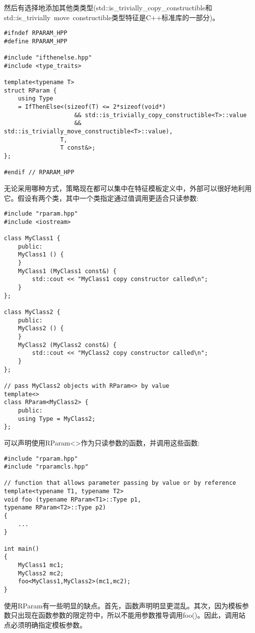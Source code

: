 然后有选择地添加其他类类型(std::is\_trivially\_copy\_constructible和std::is\_trivially\ move\ constructible类型特征是C++标准库的一部分)。

\begin{lstlisting}[style=styleCXX]
#ifndef RPARAM_HPP
#define RPARAM_HPP

#include "ifthenelse.hpp"
#include <type_traits>

template<typename T>
struct RParam {
	using Type
	= IfThenElse<(sizeof(T) <= 2*sizeof(void*)
					&& std::is_trivially_copy_constructible<T>::value
					&& std::is_trivially_move_constructible<T>::value),
				T,
				T const&>;
};

#endif // RPARAM_HPP
\end{lstlisting}

无论采用哪种方式，策略现在都可以集中在特征模板定义中，外部可以很好地利用它。假设有两个类，其中一个类指定通过值调用更适合只读参数:

\begin{lstlisting}[style=styleCXX]
#include "rparam.hpp"
#include <iostream>

class MyClass1 {
	public:
	MyClass1 () {
	}
	MyClass1 (MyClass1 const&) {
		std::cout << "MyClass1 copy constructor called\n";
	}
};

class MyClass2 {
	public:
	MyClass2 () {
	}
	MyClass2 (MyClass2 const&) {
		std::cout << "MyClass2 copy constructor called\n";
	}
};

// pass MyClass2 objects with RParam<> by value
template<>
class RParam<MyClass2> {
	public:
	using Type = MyClass2;
};
\end{lstlisting}

可以声明使用RParam<>作为只读参数的函数，并调用这些函数:

\begin{lstlisting}[style=styleCXX]
#include "rparam.hpp"
#include "rparamcls.hpp"

// function that allows parameter passing by value or by reference
template<typename T1, typename T2>
void foo (typename RParam<T1>::Type p1,
typename RParam<T2>::Type p2)
{
	...
}

int main()
{
	MyClass1 mc1;
	MyClass2 mc2;
	foo<MyClass1,MyClass2>(mc1,mc2);
}
\end{lstlisting}

使用RParam有一些明显的缺点。首先，函数声明明显更混乱。其次，因为模板参数只出现在函数参数的限定符中，所以不能用参数推导调用foo()。因此，调用站点必须明确指定模板参数。

